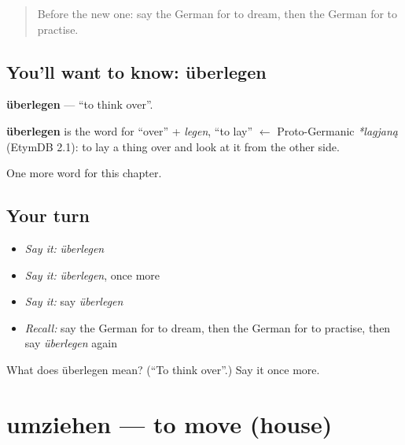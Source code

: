 \label{lesson:GE-C151-ueberlegen}



\begin{quote}
Before the new one: say the German for to dream, then the German for to practise.
\end{quote}

\subsection*{You'll want to know: überlegen}
\textbf{überlegen} — \textquotedblleft{}to think over\textquotedblright{}.

\begin{cousinweb}
\textbf{überlegen} is the word for \textquotedblleft{}over\textquotedblright{} + \emph{legen}, \textquotedblleft{}to lay\textquotedblright{} $\leftarrow$ Proto-Germanic \emph{*lagjaną} (EtymDB 2.1): to lay a thing over and look at it from the other side.
\end{cousinweb}

\begin{grammarlens}[title={What you've built}]
One more word for this chapter.
\end{grammarlens}

\subsection*{Your turn}
\begin{itemize}
\raggedright
  \item \emph{Say it:} \emph{überlegen}
  \item \emph{Say it:} \emph{überlegen}, once more
  \item \emph{Say it:} say \emph{überlegen}
  \item \emph{Recall:} say the German for to dream, then the German for to practise, then say \emph{überlegen} again
\end{itemize}

\begin{tcolorbox}[breakable,colback=teal!4,colframe=teal!35!black,title={Before you move on}]
What does überlegen mean? (\textquotedblleft{}To think over\textquotedblright{}.) Say it once more.
\end{tcolorbox}
\section[umziehen]{umziehen — to move (house)}

\label{lesson:GE-C151-umziehen}



